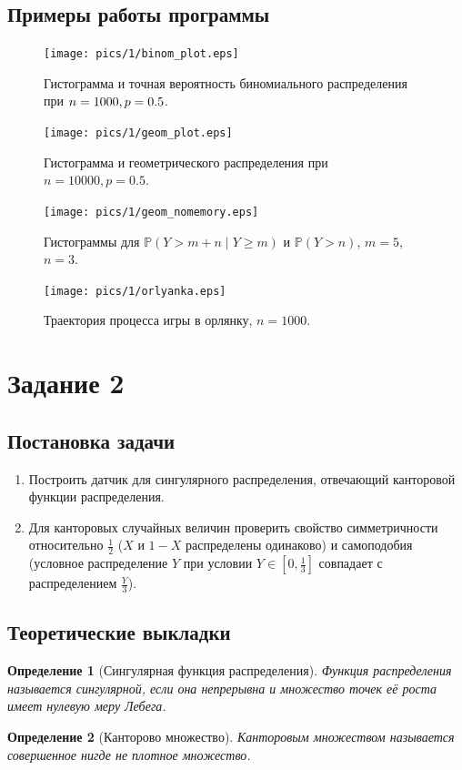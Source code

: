 \documentclass[11pt]{article}
\newtheorem{definition}{Определение}
\newcommand*{\hm}[1]{#1\nobreak\discretionary{}{\hbox{$\mathsurround=0pt #1$}}{}}
\begin{document}
\subsection{Примеры работы программы}
\begin{figure}[h!]
\centering
\texttt{[image: pics/1/binom\_plot.eps]}
\caption{Гистограмма и точная вероятность биномиального распределения при $n \hm= 1000, p = 0.5$.}
\end{figure}
\begin{figure}[h!]
	\centering
	\texttt{[image: pics/1/geom\_plot.eps]}
	\caption{Гистограмма и геометрического распределения при $n = 10000, p = 0.5$.}
\end{figure}
\begin{figure}[h!]
	\centering
	\texttt{[image: pics/1/geom\_nomemory.eps]}
	\caption{Гистограммы для $\mathbb{P}(Y > m + n \mid Y \geqslant m)$ и $\mathbb{P}(Y > n)$, $m = 5$, $n = 3$.}
\end{figure}
\begin{figure}[h!]
\centering
\texttt{[image: pics/1/orlyanka.eps]}
\caption{Траектория процесса игры в орлянку, $n=1000$.}
\end{figure}
\pagebreak
\section{Задание 2}
\subsection{Постановка задачи}
\begin{enumerate}
\item Построить датчик для сингулярного распределения, отвечающий канторовой функции распределения.
\item Для канторовых случайных величин проверить свойство симметричности относительно $\tfrac{1}{2}$ ($X$ и $1-X$ распределены одинаково) и самоподобия (условное распределение $Y$ при условии $Y \in [0, \tfrac{1}{3}]$ совпадает с распределением $\tfrac{Y}{3}$).
\end{enumerate}
\subsection{Теоретические выкладки}
\begin{definition}[Сингулярная функция распределения]
Функция распределения называется сингулярной, если она непрерывна и множество точек её роста имеет нулевую меру Лебега.
\end{definition}
\begin{definition}[Канторово множество]
Канторовым множеством называется совершенное нигде не плотное множество.
\end{definition}
\end{document}
